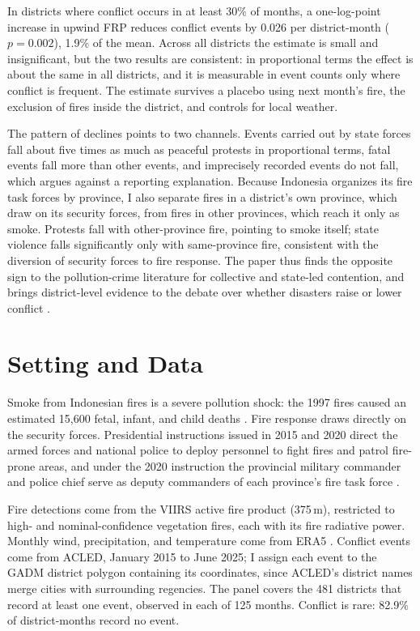 \documentclass[12pt]{article}
\begin{document}
In districts where conflict occurs in at least 30\% of months, a one-log-point increase in upwind FRP reduces conflict events by 0.026 per district-month ($p=0.002$), 1.9\% of the mean. Across all districts the estimate is small and insignificant, but the two results are consistent: in proportional terms the effect is about the same in all districts, and it is measurable in event counts only where conflict is frequent. The estimate survives a placebo using next month's fire, the exclusion of fires inside the district, and controls for local weather.

The pattern of declines points to two channels. Events carried out by state forces fall about five times as much as peaceful protests in proportional terms, fatal events fall more than other events, and imprecisely recorded events do not fall, which argues against a reporting explanation. Because Indonesia organizes its fire task forces by province, I also separate fires in a district's own province, which draw on its security forces, from fires in other provinces, which reach it only as smoke. Protests fall with other-province fire, pointing to smoke itself; state violence falls significantly only with same-province fire, consistent with the diversion of security forces to fire response. The paper thus finds the opposite sign to the pollution-crime literature \citep{herrnstadt2021, bondyrothsager2020, burkhardt2019} for collective and state-led contention, and brings district-level evidence to the debate over whether disasters raise or lower conflict \citep{nelrigharts2008, slettebak2012, woodwright2016}.

\section{Setting and Data}
\label{sec:data}

Smoke from Indonesian fires is a severe pollution shock: the 1997 fires caused an estimated 15,600 fetal, infant, and child deaths \citep{jayachandran2009}. Fire response draws directly on the security forces. Presidential instructions issued in 2015 and 2020 direct the armed forces and national police to deploy personnel to fight fires and patrol fire-prone areas, and under the 2020 instruction the provincial military commander and police chief serve as deputy commanders of each province's fire task force \citep{inpres11_2015, inpres3_2020}.

Fire detections come from the VIIRS active fire product (375\,m), restricted to high- and nominal-confidence vegetation fires, each with its fire radiative power. Monthly wind, precipitation, and temperature come from ERA5 \citep{hersbach2023era5}. Conflict events come from ACLED, January 2015 to June 2025; I assign each event to the GADM district polygon containing its coordinates, since ACLED's district names merge cities with surrounding regencies. The panel covers the 481 districts that record at least one event, observed in each of 125 months. Conflict is rare: 82.9\% of district-months record no event.
\end{document}
